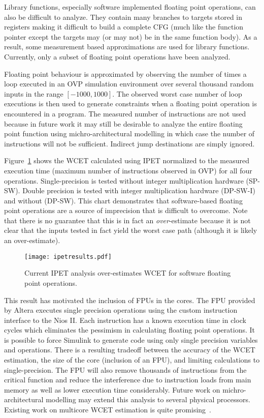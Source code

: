 Library functions, especially software implemented floating point operations, can also be difficult to analyze. They contain many branches to targets stored in registers making it difficult to build a complete CFG (much like the function pointer except the targets may (or may not) be in the same function body). As a result, some measurement based approximations are used for library functions. Currently, only a subset of floating point operations have been analyzed.


Floating point behaviour is approximated by observing the number of times a loop executed in an OVP simulation environment over several thousand random inputs in the range $[-1000,1000]$. The observed worst case number of loop executions is then used to generate constraints when a floating point operation is encountered in a program. The measured number of instructions are not used because in future work it may still be desirable to analyze the entire floating point function using michro-architectural modelling in which case the number of instructions will not be sufficient. Indirect jump destinations are simply ignored. 

Figure~\ref{f:ipetresults} shows the WCET calculated using IPET normalized to the measured execution time (maximum number of instructions observed in OVP) for all four operations. Single-precision is tested without integer multiplication hardware (SP-SW). Double precision is tested with integer multiplication hardware (DP-SW-I) and without (DP-SW). This chart demonstrates that software-based floating point operations are a source of imprecision that is difficult to overcome. Note that there is no guarantee that this is in fact an \emph{over}-estimate because it is not clear that the inputs tested in fact yield the worst case path (although it is likely an over-estimate).

\begin{figure}[h]
\centering
\texttt{[image: ipetresults.pdf]}
\caption{Current IPET analysis over-estimates WCET for software floating point operations.}
\label{f:ipetresults}
\end{figure}

This result has motivated the inclusion of FPUs in the cores. The FPU provided by Altera executes single precision operations using the custom instruction interface to the Nios II. Each instruction has a known execution time in clock cycles which eliminates the pessimism in calculating floating point operations. It is possible to force Simulink to generate code using only single precision variables and operations. There is a resulting tradeoff between the accuracy of the WCET estimation, the size of the core (inclusion of an FPU), and limiting calculations to single-precision. The FPU will also remove thousands of instructions from the critical function and reduce the interference due to instruction loads from main memory as well as lower execution time considerably. Future work on michro-architectural modelling may extend this analysis to several physical processors. Existing work on multicore WCET estimation is quite promising~\cite{chattopadhyay2014unified}.

